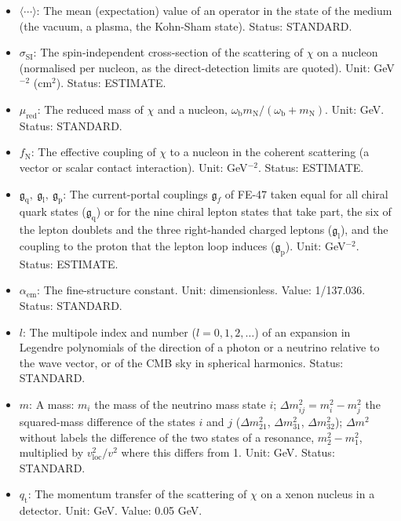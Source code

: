 \documentclass[
  10pt,
]{article}
\begin{document}
\begin{itemize}
\item
  \(\langle\cdots\rangle\): The mean (expectation) value of an operator
  in the state of the medium (the vacuum, a plasma, the Kohn-Sham
  state). Status: STANDARD.
\item
  \(\sigma_{\mathrm{SI}}\): The spin-independent cross-section of the
  scattering of \(\chi\) on a nucleon (normalised per nucleon, as the
  direct-detection limits are quoted). Unit: GeV\(^{-2}\) (cm\(^2\)).
  Status: ESTIMATE.
\item
  \(\mu_{\mathrm{red}}\): The reduced mass of \(\chi\) and a nucleon,
  \(\omega_{\mathrm{b}}m_{\mathrm{N}}/(\omega_{\mathrm{b}} + m_{\mathrm{N}})\).
  Unit: GeV. Status: STANDARD.
\item
  \(f_{\mathrm{N}}\): The effective coupling of \(\chi\) to a nucleon in
  the coherent scattering (a vector or scalar contact interaction).
  Unit: GeV\(^{-2}\). Status: ESTIMATE.
\item
  \(\mathfrak{g}_{\mathrm{q}},\ \mathfrak{g}_{\mathrm{l}},\ \mathfrak{g}_{\mathrm{p}}\):
  The current-portal couplings \(\mathfrak{g}_f\) of FE-47 taken equal
  for all chiral quark states (\(\mathfrak{g}_{\mathrm{q}}\)) or for the
  nine chiral lepton states that take part, the six of the lepton
  doublets and the three right-handed charged leptons
  (\(\mathfrak{g}_{\mathrm{l}}\)), and the coupling to the proton that
  the lepton loop induces (\(\mathfrak{g}_{\mathrm{p}}\)). Unit:
  GeV\(^{-2}\). Status: ESTIMATE.
\item
  \(\alpha_{\mathrm{em}}\): The fine-structure constant. Unit:
  dimensionless. Value: 1/137.036. Status: STANDARD.
\item
  \(l\): The multipole index and number (\(l = 0, 1, 2, \dots\)) of an
  expansion in Legendre polynomials of the direction of a photon or a
  neutrino relative to the wave vector, or of the CMB sky in spherical
  harmonics. Status: STANDARD.
\item
  \(m\): A mass: \(m_i\) the mass of the neutrino mass state \(i\);
  \(\Delta m_{ij}^2 = m_i^2 - m_j^2\) the squared-mass difference of the
  states \(i\) and \(j\) (\(\Delta m_{21}^2\), \(\Delta m_{31}^2\),
  \(\Delta m_{32}^2\)); \(\Delta m^2\) without labels the difference of
  the two states of a resonance, \(m_2^2 - m_1^2\), multiplied by
  \(v_{\mathrm{loc}}^2/v^2\) where this differs from 1. Unit: GeV.
  Status: STANDARD.
\item
  \(q_{\mathrm{t}}\): The momentum transfer of the scattering of
  \(\chi\) on a xenon nucleus in a detector. Unit: GeV. Value: 0.05 GeV.

\end{itemize}
\end{document}
